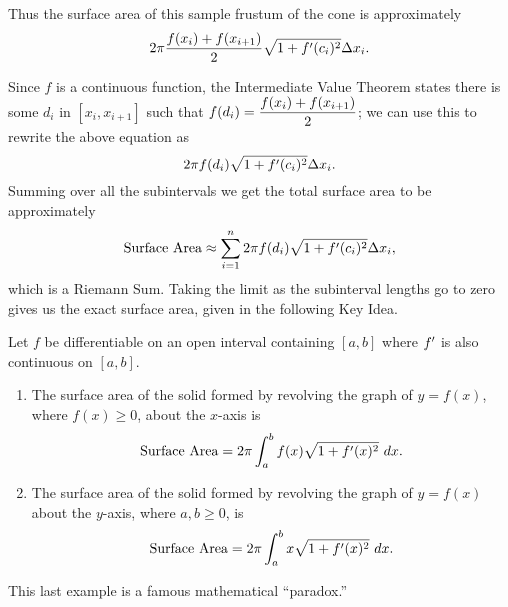 Thus the surface area of this sample frustum of the cone is approximately 
$$2\pi\frac{f(x_i)+f(x_{i+1})}2\sqrt{1+f'(c_i)^2}\Delta x_i.$$

Since $f$ is a continuous function, the Intermediate Value Theorem states there is some $d_i$ in $[x_i,x_{i+1}]$ such that \newline $\displaystyle f(d_i) = \frac{f(x_i)+f(x_{i+1})}2$; we can use this to rewrite the above equation as
$$2\pi f(d_i)\sqrt{1+f'(c_i)^2}\Delta x_i.$$
Summing over all the subintervals we get the total surface area to be approximately 
$$\text{Surface Area}\approx \sum_{i=1}^n 2\pi f(d_i)\sqrt{1+f'(c_i)^2}\Delta x_i,$$
which is a Riemann Sum. Taking the limit as the subinterval lengths go to zero gives us the exact surface area, given in the following Key Idea.

{Let $f$ be differentiable on an open interval containing $[a,b]$ where $f'$ is also continuous on $[a,b]$. 
	\begin{enumerate}[1)]
	\item	The surface area of the solid formed by revolving the graph of $y=f(x)$, where $f(x)\geq0$, about the $x$-axis is
	$$\text{Surface Area} = 2\pi\int_a^b f(x)\sqrt{1+f'(x)^2}\ dx.$$
	\item	The surface area of the solid formed by revolving the graph of $y=f(x)$ about the $y$-axis, where $a,b\geq0$, is
	$$\text{Surface Area} = 2\pi\int_a^b x\sqrt{1+f'(x)^2}\ dx.$$
	\end{enumerate}
} %




This last example is a famous mathematical ``paradox.''


